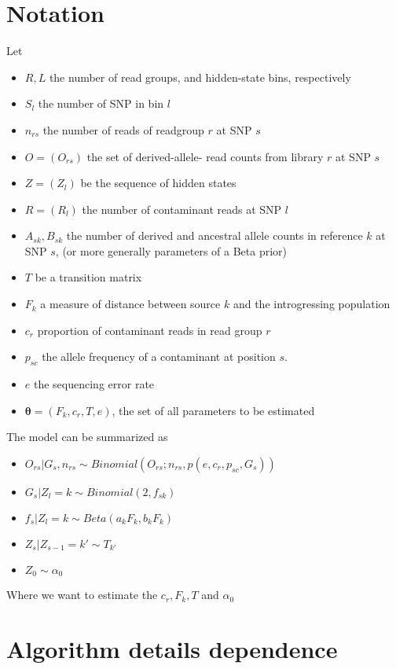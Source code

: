 \documentclass[10pt,a4paper]{article}
\begin{document}
\section*{Notation}
	Let 
	\begin{itemize}
		\item $R, L$ the number of read groups, and hidden-state bins, respectively
		\item $S_l$ the number of SNP in bin $l$
		\item $n_{rs}$ the number of reads of readgroup $r$ at SNP $s$
		\item $O = (O_{rs})$ the set of derived-allele- read counts from library $r$ at SNP $s$
		\item $Z = (Z_l)$ be the sequence of hidden states
		\item $R = (R_{l})$ the number of contaminant reads at SNP $l$
		\item $A_{sk}, B_{sk}$ the number of derived and ancestral allele counts in reference $k$ at SNP $s$, (or more generally parameters of a Beta prior)
		\item $T$ be a transition matrix		
		\item $F_k$ a measure of distance between source $k$ and the introgressing population
		\item $c_r$ proportion of contaminant reads in read group $r$
		\item $p_{sc}$ the allele frequency of a contaminant at position $s$. 
		\item $e$ the sequencing error rate
		\item $\mathbf{\theta} = (F_k, c_r, T, e)$, the set of all parameters to be estimated
	\end{itemize}
The model can be summarized as
	\begin{itemize}
		\item $O_{rs} | G_{s}, n_{rs} \sim Binomial(O_{rs}; n_{rs}, p(e, c_r, p_{sc}, G_{s}))$
		\item $G_s|Z_l=k \sim Binomial(2, f_{sk})$
		\item $f_{s} | Z_l=k \sim Beta(a_kF_k, b_kF_k)$
		\item $Z_s | Z_{s-1}= k' \sim T_{k'}$
		\item $Z_0 \sim \alpha_0$
	\end{itemize}
	Where we want to estimate the $c_r, F_k, T$ and $\alpha_0$
\section{Algorithm details dependence}
\end{document}
